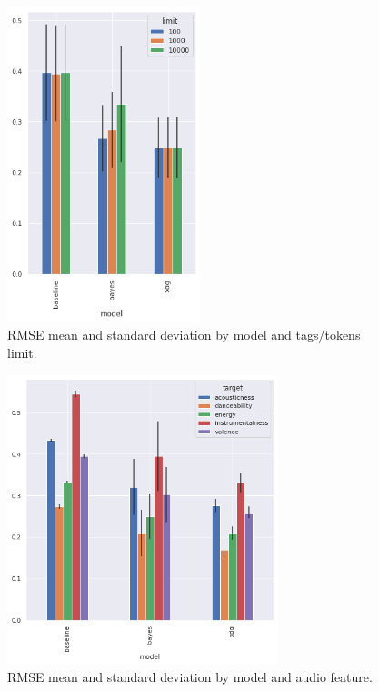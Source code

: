 \documentclass[sn-mathphys]{sn-jnl}%
\theoremstyle{thmstyleone}%
\theoremstyle{thmstyletwo}%
\theoremstyle{thmstylethree}%
\begin{document}
\begin{figure}[h!]
      \centering
      \includegraphics[width=0.5\textwidth]{images/rmse_by_model_and_limit.png}
      \caption{RMSE mean and standard deviation by model and tags/tokens limit.}
      \label{fig:rmse_by_model_and_limit}
\end{figure}


\begin{figure}[h!]
      \centering
      \includegraphics[width=0.7\textwidth]{images/rmse_by_model_and_feature.png}
      \caption{RMSE mean and standard deviation by model and audio feature.}
      \label{fig:rmse_by_model_and_feature}
\end{figure}
\end{document}
